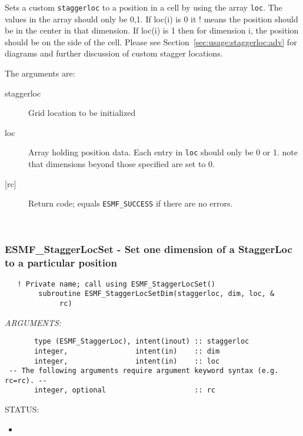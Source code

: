       Sets a custom {\tt staggerloc} to a position in a cell by using the array
      {\tt loc}. The values in the array should only be 0,1. If loc(i) is 0 it 
  !    means the position should be in the center in that dimension. If loc(i) is 1 then
      for dimension i, the position should be on the side of the cell. 
      Please see Section~\ref{sec:usage:staggerloc:adv}
      for diagrams and further discussion of custom stagger locations. 
  
       The arguments are:
       \begin{description}
       \item[staggerloc]
            Grid location to be initialized
       \item[loc]
            Array holding position data. Each entry in {\tt loc} should only
            be  0 or 1. note that dimensions beyond those specified are set to 0. 
       \item[{[rc]}]
            Return code; equals {\tt ESMF\_SUCCESS} if there are no errors.
     \end{description}
   
 
\mbox{}\hrulefill\ 
 
\subsubsection [ESMF\_StaggerLocSet] {ESMF\_StaggerLocSet - Set one dimension of a StaggerLoc to a particular position}


 
\begin{verbatim}   ! Private name; call using ESMF_StaggerLocSet() 
        subroutine ESMF_StaggerLocSetDim(staggerloc, dim, loc, &
             rc)\end{verbatim}{\em ARGUMENTS:}
\begin{verbatim}       type (ESMF_StaggerLoc), intent(inout) :: staggerloc
       integer,                intent(in)    :: dim
       integer,                intent(in)    :: loc
 -- The following arguments require argument keyword syntax (e.g. rc=rc). --
       integer, optional                     :: rc 
 \end{verbatim}
{\sf STATUS:}
   \begin{itemize}
   \item{}
   \end{itemize}
  
